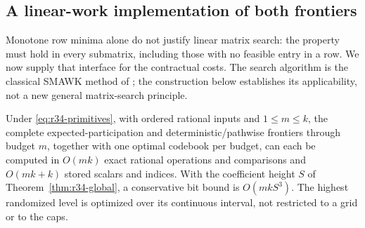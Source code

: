 \subsection{A linear-work implementation of both frontiers}\label{sec:r36-linear}
Monotone row minima alone do not justify linear matrix search: the property must hold in every submatrix, including those with no feasible entry in a row. We now supply that interface for the contractual costs. The search algorithm is the classical SMAWK method of \citet{AggarwalEtAl1987}; the construction below establishes its applicability, not a new general matrix-search principle.

\begin{theorem}\label{thm:r36-linear}
Under \eqref{eq:r34-primitives}, with ordered rational inputs and $1\leq m\leq k$, the complete expected-participation and deterministic/pathwise frontiers through budget $m$, together with one optimal codebook per budget, can each be computed in $O(mk)$ exact rational operations and comparisons and $O(mk+k)$ stored scalars and indices. With the coefficient height $S$ of Theorem~\ref{thm:r34-global}, a conservative bit bound is $O(mkS^3)$. The highest randomized level is optimized over its continuous interval, not restricted to a grid or to the caps.
\end{theorem}
